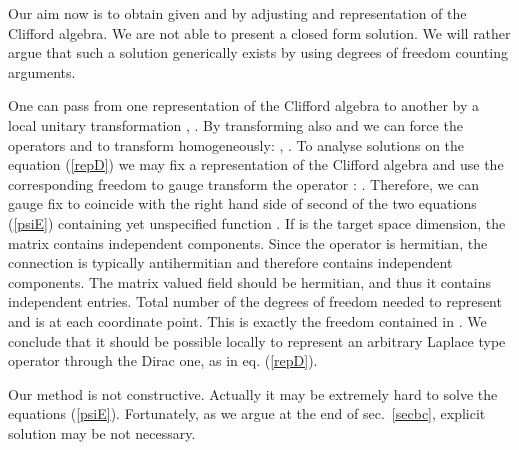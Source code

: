 \documentclass[a4paper,12pt,twoside]{article}
\begin{document}
Our aim now is to obtain given \myHighlight{$\omega$}\coordHE{} and \coordHE{} by adjusting
\myHighlight{$\psi$}\coordHE{} and representation of the Clifford algebra. We are not able
to present a closed form solution. We will rather argue that such
a solution generically exists by using degrees of freedom counting
arguments. 

One can pass from one representation of the Clifford algebra to
another by a local unitary transformation 
\coordHE{}, \coordHE{}.
By transforming also \myHighlight{$\tilde\omega$}\coordHE{} and \myHighlight{$\psi$}\coordHE{} we can force
the operators \coordHE{} and \coordHE{} to transform homogeneously:
\coordHE{}, \coordHE{}.
To analyse solutions on the equation (\ref{repD}) we may fix
a representation of the Clifford algebra and use the corresponding
freedom to gauge transform the operator \coordHE{}:
\coordHE{}. Therefore, we can
gauge fix \coordHE{} to coincide with the right hand side of
second of the two equations (\ref{psiE}) containing yet unspecified
function \myHighlight{$\psi$}\coordHE{}. If \coordHE{} is the target space dimension, the 
matrix \myHighlight{$\psi$}\coordHE{} contains \coordHE{} independent components.
Since the operator \coordHE{} is hermitian, the connection \coordHE{}
is typically antihermitian and therefore contains \coordHE{}
independent components. The matrix valued field \coordHE{} should be
hermitian, and thus it contains \coordHE{} independent entries.
Total number of the degrees of freedom needed to represent
\coordHE{} and \coordHE{} is \coordHE{} at each coordinate point. This is
exactly the freedom contained in \myHighlight{$\psi$}\coordHE{}. We conclude that it
should be possible locally to represent an arbitrary Laplace
type operator \coordHE{} through the Dirac one, as in eq. (\ref{repD}).

Our method is not constructive. Actually it may be extremely
hard to solve the equations (\ref{psiE}). Fortunately, as
we argue at the end of sec.~\ref{secbc}, explicit solution may
be not necessary. 
 
\end{document}

